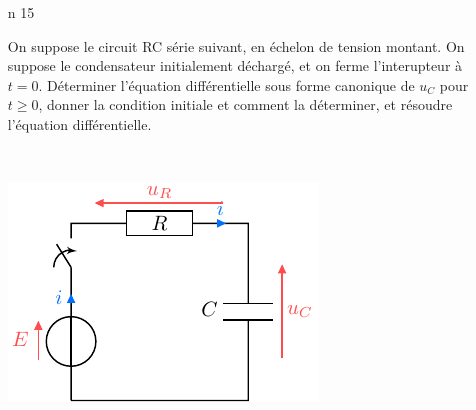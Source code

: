\documentclass[a4paper, 10pt, final, garamond]{book}
\begin{document}
\begin{enumerate}[label=\sqenumi, leftmargin=10pt]
\begin{isd}[lefthand ratio=.30]
\begin{center}
{			      }%
			      \vspace{-15pt}
		      \end{center}
		      \tcblower
		      \vspace{-15pt}
	      \end{isd}
	\item[n]{15} %
	      \noindent
	      \begin{minipage}[t]{.69\linewidth}
		      On suppose le circuit RC série suivant, en échelon de tension montant. On
		      suppose le condensateur initialement déchargé, et on ferme l'interupteur à
		      $t=0$. Déterminer l'équation différentielle sous forme canonique de $u_C$
		      pour $t \geq 0$, donner la condition initiale et comment la déterminer, et
		      résoudre l'équation différentielle.
	      \end{minipage}
	      \hfill
	      \begin{minipage}[t]{.29\linewidth}
		      ~
		      \vspace{-30pt}
		      \begin{center}
			      \includegraphics[width=.7\linewidth]{circ_rc-start}
		      \end{center}
	      \end{minipage}
	      \begin{isd}[sidebyside align=top]
\end{isd}
\end{enumerate}
\end{document}
